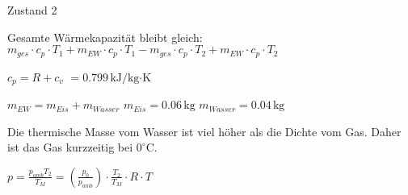 Zustand 2  

Gesamte Wärmekapazität bleibt gleich:  
\( m_{ges} \cdot c_p \cdot T_1 + m_{EW} \cdot c_p \cdot T_1 - m_{ges} \cdot c_p \cdot T_2 + m_{EW} \cdot c_p \cdot T_2 \)  

\( c_p = R + c_v \)  
\( = 0.799 \, \text{kJ/kg·K} \)  

\( m_{EW} = m_{Eis} + m_{Wasser} \)  
\( m_{Eis} = 0.06 \, \text{kg} \)  
\( m_{Wasser} = 0.04 \, \text{kg} \)  

Die thermische Masse vom Wasser ist viel höher als die Dichte vom Gas. Daher ist das Gas kurzzeitig bei \( 0^\circ \text{C} \).  

\( p = \frac{p_{amb} T_2}{T_M} = \left( \frac{p_0}{p_{amb}} \right) \cdot \frac{T_2}{T_M} \cdot R \cdot T \)